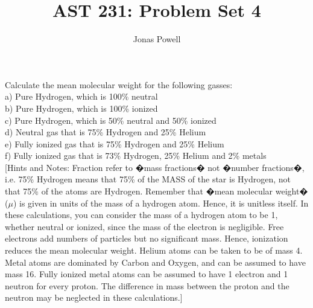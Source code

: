\documentclass[12pt]{article}
\newenvironment{problem}[2][Problem]{\begin{trivlist}
\item[\hskip \labelsep {\bfseries #1}\hskip \labelsep {\bfseries #2.}]}{\end{trivlist}}
\begin{document}

\title{AST 231: Problem Set 4}
\author{Jonas Powell}
\maketitle

\begin{problem}{1}

Calculate the mean molecular weight for the following gasses: \\

a) Pure Hydrogen, which is 100\% neutral \\

b) Pure Hydrogen, which is 100\% ionized \\

c) Pure Hydrogen, which is 50\% neutral and 50\% ionized \\

d) Neutral gas that is 75\% Hydrogen and 25\% Helium \\

e) Fully ionized gas that is 75\% Hydrogen and 25\% Helium \\

f) Fully ionized gas that is 73\% Hydrogen, 25\% Helium and 2\% metals \\


[Hints and Notes: Fraction refer to �mass fractions� not �number fractions�, i.e. 75\% Hydrogen means that 75\% of the MASS of the star is Hydrogen, not that 75\% of the atoms are Hydrogen. Remember that �mean molecular weight� ($\mu$) is given in units of the mass
of a hydrogen atom. Hence, it is unitless itself. In these calculations, you can consider the mass of a hydrogen atom to be 1, whether
neutral or ionized, since the mass of the electron is negligible. Free electrons add numbers of particles but no significant mass. Hence,
ionization reduces the mean molecular weight. Helium atoms can be taken to be of mass 4. Metal atoms are dominated by Carbon and
Oxygen, and can be assumed to have mass 16. Fully ionized metal atoms can be assumed to have 1 electron and 1 neutron for every
proton. The difference in mass between the proton and the neutron may be neglected in these calculations.]
\end{problem}
\end{document}
